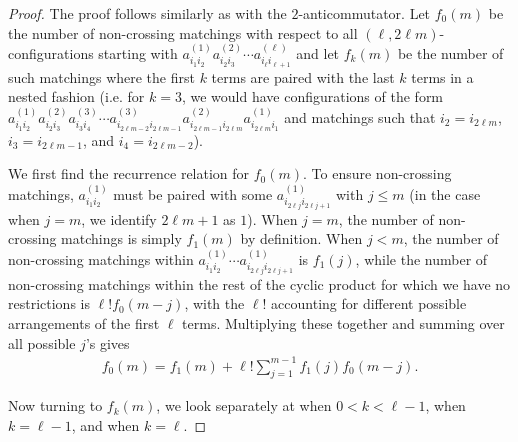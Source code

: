 \documentclass[11pt,reqno]{amsart}
\numberwithin{equation}{section}
\theoremstyle{plain}
\begin{document}
\begin{proof}
The proof follows similarly as with the $2$-anticommutator. Let $f_0(m)$ be the number of non-crossing matchings with respect to all $(\ell, 2\ell m)$-configurations starting with $a^{(1)}_{i_1i_2}a^{(2)}_{i_2i_3}\cdots a^{(\ell)}_{i_\ell i_{\ell+1}}$ and let $f_k(m)$ be the number of such matchings where the first $k$ terms are paired with the last $k$ terms in a nested fashion (i.e. for $k=3$, we would have configurations of the form $a^{(1)}_{i_1i_2}a^{(2)}_{i_2i_3}a^{(3)}_{i_3i_4}\cdots a^{(3)}_{i_{2\ell m-2}i_{2\ell m-1}}a^{(2)}_{i_{2\ell m-1}i_{2\ell m}}a^{(1)}_{i_{2\ell m}i_{1}}$ and matchings such that $i_2=i_{2\ell m}$, $i_3=i_{2\ell m-1}$, and $i_4=i_{2\ell m-2}$).

We first find the recurrence relation for $f_0(m)$. To ensure non-crossing matchings, $a^{(1)}_{i_1 i_2}$ must be paired with some $a^{(1)}_{i_{2\ell j} i_{2\ell j+1}}$ with $j\leq m$ (in the case when $j=m$, we identify $2\ell m+1$ as $1$). When $j=m$, the number of non-crossing matchings is simply $f_1(m)$ by definition. When $j<m$, the number of non-crossing matchings within $a^{(1)}_{i_1 i_2}\cdots a^{(1)}_{i_{2\ell j} i_{2\ell j+1}}$ is $f_1(j)$, while the number of non-crossing matchings within the rest of the cyclic product for which we have no restrictions is $\ell!f_0(m-j)$, with the $\ell!$ accounting for different possible arrangements of the first $\ell$ terms. Multiplying these together and summing over all possible $j$'s gives
\begin{align}
f_0(m)=f_1(m)+\ell! \sum_{j=1}^{m-1}f_1(j)f_0(m-j).
\end{align}

Now turning to $f_k(m)$, we look separately at when $0<k<\ell-1$, when $k=\ell-1$, and when $k=\ell$.


\end{proof}
\end{document}
